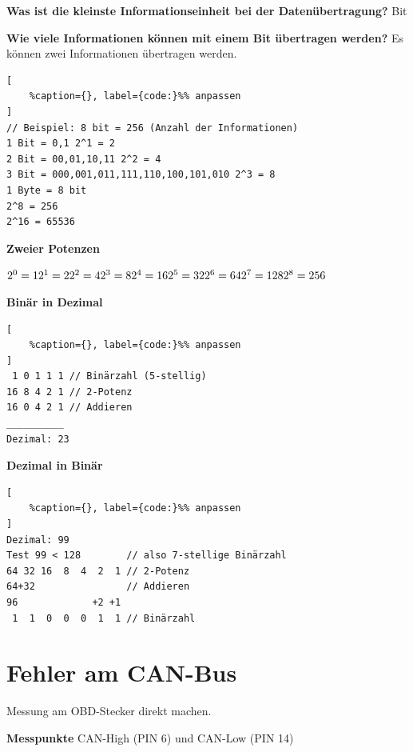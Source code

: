 \textbf{Was ist die kleinste Informationseinheit bei der
Datenübertragung?} Bit

\textbf{Wie viele Informationen können mit einem Bit übertragen werden?}
Es können zwei Informationen übertragen werden.

\lstset{language=Python}%
\begin{lstlisting}[
	%caption={}, label={code:}%% anpassen
]
// Beispiel: 8 bit = 256 (Anzahl der Informationen)
1 Bit = 0,1 2^1 = 2
2 Bit = 00,01,10,11 2^2 = 4
3 Bit = 000,001,011,111,110,100,101,010 2^3 = 8
1 Byte = 8 bit
2^8 = 256
2^16 = 65536 
\end{lstlisting}

\textbf{Zweier Potenzen}

$2^0 = 1 \\ 2^1 = 2 \\2^2 = 4 \\2^3 = 8 \\2^4 = 16 \\2^5 = 32 \\2^6 = 64 \\2^7 = 128 \\2^8 = 256$

\textbf{Binär in Dezimal}

\lstset{language=Python}%
\begin{lstlisting}[
	%caption={}, label={code:}%% anpassen
]
 1 0 1 1 1 // Binärzahl (5-stellig)
16 8 4 2 1 // 2-Potenz
16 0 4 2 1 // Addieren
__________
Dezimal: 23
\end{lstlisting}

\textbf{Dezimal in Binär}

\lstset{language=Python}%
\begin{lstlisting}[
	%caption={}, label={code:}%% anpassen
]
Dezimal: 99
Test 99 < 128        // also 7-stellige Binärzahl
64 32 16  8  4  2  1 // 2-Potenz
64+32                // Addieren
96             +2 +1 
 1  1  0  0  0  1  1 // Binärzahl 
\end{lstlisting}

\newpage

\section{Fehler am CAN-Bus}\label{fehler-am-can-bus}

Messung am OBD-Stecker direkt machen.

\textbf{Messpunkte} CAN-High (PIN 6) und CAN-Low (PIN 14)

